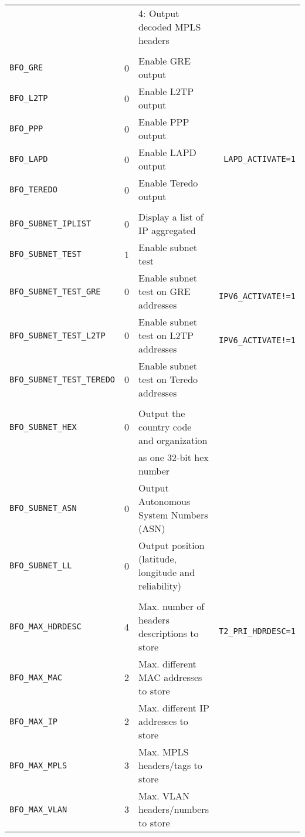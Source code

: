 \documentclass[documentation]{subfiles}
\begin{document}
\begin{longtable}{>{\tt}lcl>{\tt\small}l}
                              &   & 4: Output decoded MPLS headers                        & \\
    \\
    BFO\_GRE                  & 0 & Enable GRE output                                     & \\
    BFO\_L2TP                 & 0 & Enable L2TP output                                    & \\
    BFO\_PPP                  & 0 & Enable PPP output                                     & \\
    BFO\_LAPD                 & 0 & Enable LAPD output                                    & LAPD\_ACTIVATE=1\\
    BFO\_TEREDO               & 0 & Enable Teredo output                                  & \\
    \\
    BFO\_SUBNET\_IPLIST       & 0 & Display a list of IP aggregated                       & \\

    BFO\_SUBNET\_TEST         & 1 & Enable subnet test                                    & \\
    BFO\_SUBNET\_TEST\_GRE    & 0 & Enable subnet test on GRE addresses                   & IPV6\_ACTIVATE!=1\\
    BFO\_SUBNET\_TEST\_L2TP   & 0 & Enable subnet test on L2TP addresses                  & IPV6\_ACTIVATE!=1\\
    BFO\_SUBNET\_TEST\_TEREDO & 0 & Enable subnet test on Teredo addresses                & \\
    \\
    BFO\_SUBNET\_HEX          & 0 & Output the country code and organization              & \\
                              &   & \qquad as one 32-bit hex number                       & \\
    BFO\_SUBNET\_ASN          & 0 & Output Autonomous System Numbers (ASN)                & \\
    BFO\_SUBNET\_LL           & 0 & Output position (latitude, longitude and reliability) & \\
    \\
    BFO\_MAX\_HDRDESC         & 4 & Max. number of headers descriptions to store          & T2\_PRI\_HDRDESC=1\\
    BFO\_MAX\_MAC             & 2 & Max. different MAC addresses to store                 & \\
    BFO\_MAX\_IP              & 2 & Max. different IP addresses to store                  & \\
    BFO\_MAX\_MPLS            & 3 & Max. MPLS headers/tags to store                       & \\
    BFO\_MAX\_VLAN            & 3 & Max. VLAN headers/numbers to store                    & \\
    \bottomrule
\end{longtable}
\end{document}
